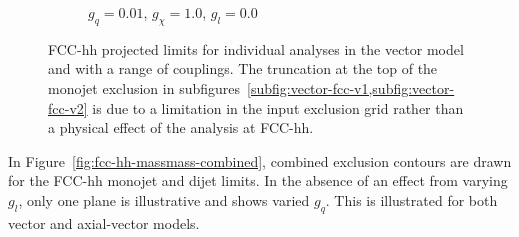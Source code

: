 \documentclass[11pt]{article}
\begin{document}
\begin{figure}
\begin{subfigure}[b]{0.49\textwidth}
         \caption{$g_q=0.01$, $g_{\chi}=1.0$, $g_l=0.0$}
         \label{subfig:vector-fcc-v4}       
     \end{subfigure}
        \caption{FCC-hh projected limits for individual analyses in the vector model and with a range of couplings. The truncation at the top of the monojet exclusion in subfigures~\ref{subfig:vector-fcc-v1,subfig:vector-fcc-v2} is due to a limitation in the input exclusion grid rather than a physical effect of the analysis at FCC-hh.}
        \label{fig:fcc-hh-massmass-separate}
\end{figure}

In Figure~\ref{fig:fcc-hh-massmass-combined}, combined exclusion contours are drawn for the FCC-hh monojet and dijet limits. In the absence of an effect from varying $g_l$, only one plane is illustrative and shows varied $g_q$. This is illustrated for both vector and axial-vector models.
\end{document}
